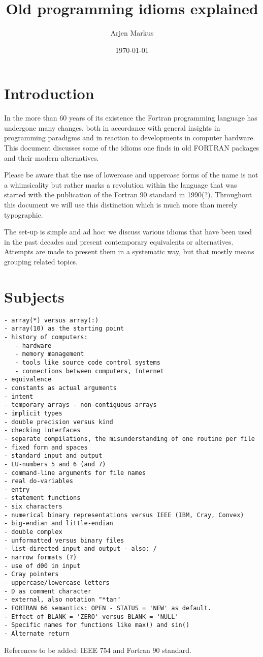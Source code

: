 \documentclass{article}
\date{\today}
\author{Arjen Markus}
\title{Old programming idioms explained}
\begin{document}
\maketitle

\section{Introduction}
In the more than 60 years of its existence the Fortran programming
language has undergone many changes, both in accordance with general insights
in programming paradigms and in reaction to developments in computer hardware.
This document discusses some of the idioms one finds in old FORTRAN packages
and their modern alternatives.

Please be aware that the use of lowercase and uppercase forms of the name is
not a whimsicality but rather marks a revolution within the language that was
started with the publication of the Fortran 90 standard in 1990(?). Throughout
this document we will use this distinction which is much more than merely
typographic.

The set-up is simple and ad hoc: we discuss various idioms that have been
used in the past decades and present contemporary equivalents or alternatives.
Attempts are made to present them in a systematic way, but that mostly means grouping
related topics.









\section{Subjects}
\begin{verbatim}
- array(*) versus array(:)
- array(10) as the starting point
- history of computers:
   - hardware
   - memory management
   - tools like source code control systems
   - connections between computers, Internet
- equivalence
- constants as actual arguments
- intent
- temporary arrays - non-contiguous arrays
- implicit types
- double precision versus kind
- checking interfaces
- separate compilations, the misunderstanding of one routine per file
- fixed form and spaces
- standard input and output
- LU-numbers 5 and 6 (and 7)
- command-line arguments for file names
- real do-variables
- entry
- statement functions
- six characters
- numerical binary representations versus IEEE (IBM, Cray, Convex)
- big-endian and little-endian
- double complex
- unformatted versus binary files
- list-directed input and output - also: /
- narrow formats (?)
- use of d00 in input
- Cray pointers
- uppercase/lowercase letters
- D as comment character
- external, also notation "*tan"
- FORTRAN 66 semantics: OPEN - STATUS = 'NEW' as default.
- Effect of BLANK = 'ZERO' versus BLANK = 'NULL'
- Specific names for functions like max() and sin()
- Alternate return
\end{verbatim}


References to be added: IEEE 754 and Fortran 90 standard.
\end{document}

